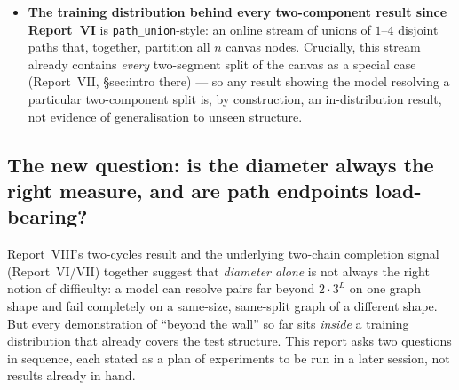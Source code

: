 \documentclass[11pt,a4paper]{article}
\begin{document}
\begin{itemize}
        collapsed to predicting the entire graph connected at \emph{every} split and every
        seed (predicted-positive rate exactly $1.000$, cut exactly $0.000$) --- read as a
        generic out-of-distribution collapse on an unfamiliar canvas, not a clean test of
        whether path endpoints specifically matter, since the training distribution never
        contained a cycle of any kind.
  \item \textbf{The training distribution behind every two-component result since Report~VI}
        is \texttt{path\_union}-style: an online stream of unions of $1$--$4$ disjoint paths
        that, together, partition all $n$ canvas nodes. Crucially, this stream already
        contains \emph{every} two-segment split of the canvas as a special case (Report~VII,
        \S sec:intro there) --- so any result showing the model resolving a particular
        two-component split is, by construction, an in-distribution result, not evidence of
        generalisation to unseen structure.
\end{itemize}

\subsection{The new question: is the diameter always the right measure, and are path endpoints
load-bearing?}
\label{sec:question}

Report~VIII's two-cycles result and the underlying two-chain completion signal (Report~VI/VII)
together suggest that \emph{diameter alone} is not always the right notion of difficulty: a
model can resolve pairs far beyond $2\cdot 3^L$ on one graph shape and fail completely on a
same-size, same-split graph of a different shape. But every demonstration of ``beyond the
wall'' so far sits \emph{inside} a training distribution that already covers the test
structure. This report asks two questions in sequence, each stated as a plan of experiments to
be run in a later session, not results already in hand.
\end{document}
